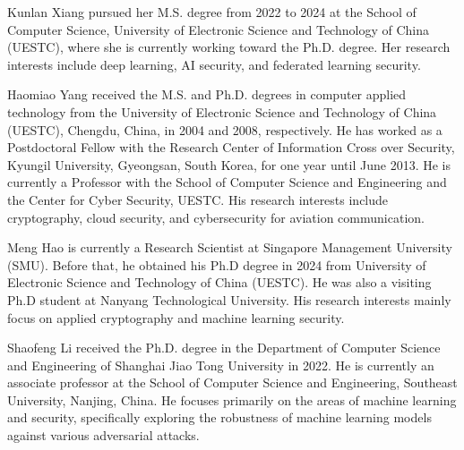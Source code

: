 

\begin{IEEEbiography}{Kunlan Xiang} pursued her M.S. degree from 2022 to 2024 at the School of Computer Science, University of Electronic Science and Technology of China (UESTC), where she is currently working toward the Ph.D. degree. Her research interests include deep learning, AI security, and federated learning security.
\end{IEEEbiography}
\begin{IEEEbiography}{Haomiao Yang}
received the M.S. and Ph.D. degrees in computer applied technology from the University of Electronic Science and Technology of China (UESTC), Chengdu, China, in 2004 and 2008, respectively. He has worked as a Postdoctoral Fellow with the Research Center of Information Cross over Security, Kyungil University, Gyeongsan, South Korea, for one year until June 2013. He is currently a Professor with the School of Computer Science and Engineering and the Center for Cyber Security, UESTC. His research interests include cryptography, cloud security, and cybersecurity for aviation communication.
\end{IEEEbiography}
\begin{IEEEbiography}{Meng Hao} is currently a Research Scientist at Singapore Management University (SMU). Before that, he obtained his Ph.D degree in 2024 from University of Electronic Science and Technology of China (UESTC). He was also a visiting Ph.D student at Nanyang Technological University. His research interests mainly focus on applied cryptography and machine learning security.
\end{IEEEbiography}
\begin{IEEEbiography}{Shaofeng Li} received the Ph.D. degree in the Department of Computer Science and Engineering of Shanghai Jiao Tong University in 2022. He is currently an associate professor at the School of Computer Science and Engineering, Southeast University, Nanjing, China. He focuses primarily on the areas of machine learning and security, specifically exploring the robustness of machine learning models against various adversarial attacks.
\end{IEEEbiography}
